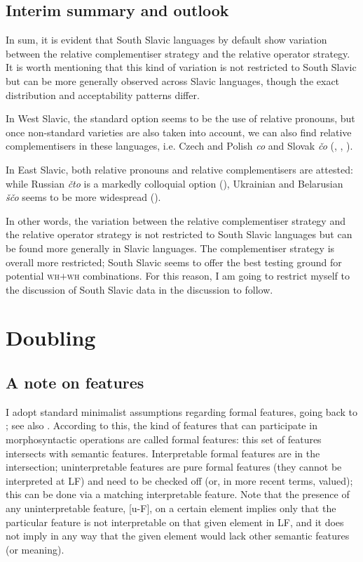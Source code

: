 \documentclass[output=paper]{langscibook}
\begin{document}
\subsection{Interim summary and outlook} \label{bacsk:sec:interim}
In sum, it is evident that South Slavic languages by default show variation between the relative complementiser strategy and the relative operator strategy. It is worth mentioning that this kind of variation is not restricted to South Slavic but can be more generally observed across Slavic languages, though the exact distribution and acceptability patterns differ.

In West Slavic, the standard option seems to be the use of relative pronouns, but once non-standard varieties are also taken into account, we can also find relative complementisers in these languages, i.e. Czech and Polish \textit{co} and Slovak \textit{čo} (\citealt{simik2008}, \citealt{guz2017}, \citealt{minlos2012}).

In East Slavic, both relative pronouns and relative complementisers are attested: while Russian \textit{čto} is a markedly colloquial option (\citealt{meyer2017}), Ukrainian and Belarusian \textit{\v{s}\v{c}o} seems to be more widespread (\citealt{danylenko2018}).

In other words, the variation between the relative complementiser strategy and the relative operator strategy is not restricted to South Slavic languages but can be found more generally in Slavic languages. The complementiser strategy is overall more restricted; South Slavic seems to offer the best testing ground for potential \textsc{wh}$+$\textsc{wh} combinations. For this reason, I am going to restrict myself to the discussion of South Slavic data in the discussion to follow.

\section{Doubling} \label{bacsk:sec:doubling}
\subsection{A note on features} \label{bacsk:sec:note}
I adopt standard minimalist assumptions regarding formal features, going back to \citet{chomsky1995}; see also \citet{zeijlstra2014}. According to this, the kind of features that can participate in morphosyntactic operations are called formal features: this set of features intersects with semantic features. Interpretable formal features are in the intersection; uninterpretable features are pure formal features (they cannot be interpreted at LF) and need to be checked off (or, in more recent terms, valued); this can be done via a matching interpretable feature. Note that the presence of any uninterpretable feature, [u-F], on a certain element implies only that the particular feature is not interpretable on that given element in LF, and it does not imply in any way that the given element would lack other semantic features (or meaning).
\end{document}
